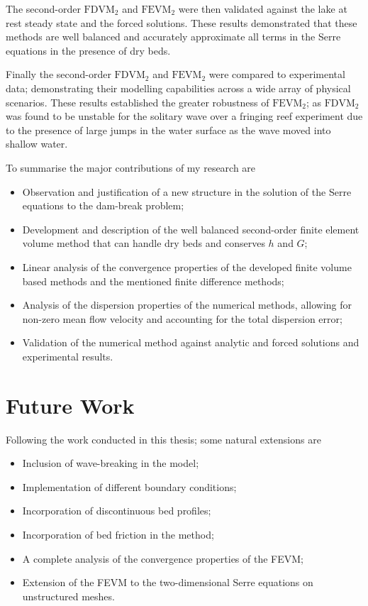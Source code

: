 The second-order $\text{FDVM}_2$ and $\text{FEVM}_2$ were then validated against the lake at rest steady state and the forced solutions. These results demonstrated that these methods are well balanced and accurately approximate all terms in the Serre equations in the presence of dry beds. 

Finally the second-order $\text{FDVM}_2$ and $\text{FEVM}_2$ were compared to experimental data; demonstrating their modelling capabilities across a wide array of physical scenarios. These results established the greater robustness of $\text{FEVM}_2$; as $\text{FDVM}_2$ was found to be unstable for the solitary wave over a fringing reef experiment due to the presence of large jumps in the water surface as the wave moved into shallow water. 

To summarise the major contributions of my research are
\begin{itemize}
	\item Observation and justification of a new structure in the solution of the Serre equations to the dam-break problem;
	\item Development and description of the well balanced second-order finite element volume method that can handle dry beds and conserves $h$ and $G$;
	\item Linear analysis of the convergence properties of the developed finite volume based methods and the mentioned finite difference methods;
	\item Analysis of the dispersion properties of the numerical methods, allowing for non-zero mean flow velocity and accounting for the total dispersion error;
	\item Validation of the numerical method against analytic and forced solutions and experimental results. 
\end{itemize}

\section{Future Work}
Following the work conducted in this thesis; some natural extensions are
\begin{itemize}
	\item Inclusion of wave-breaking in the model; 
	\item Implementation of different boundary conditions;
	\item Incorporation of discontinuous bed profiles;
	\item Incorporation of bed friction in the method;
	\item A complete analysis of the convergence properties of the FEVM;
	\item Extension of the FEVM to the two-dimensional Serre equations on unstructured meshes.
\end{itemize}




